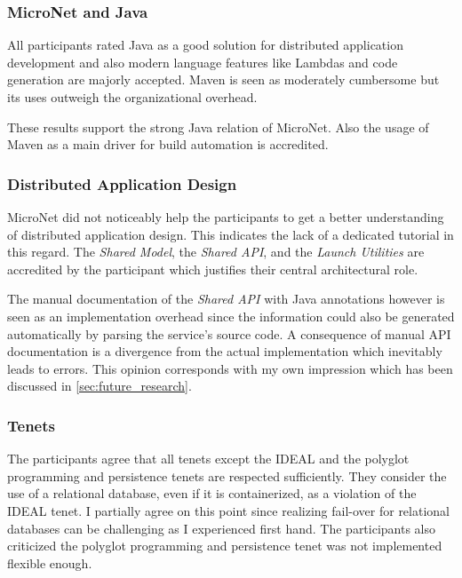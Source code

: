 \subsubsection{MicroNet and Java}

All participants rated Java as a good solution for distributed application
development and also modern language features like Lambdas and code generation
are majorly accepted. Maven is seen as moderately cumbersome but its uses
outweigh the organizational overhead.

These results support the strong Java relation of MicroNet. Also the usage of
Maven as a main driver for build automation is accredited.

\subsubsection{Distributed Application Design}

MicroNet did not noticeably help the participants to get a better understanding
of distributed application design. This indicates the lack of a dedicated
tutorial in this regard. The \textit{Shared Model}, the \textit{Shared API}, and
the \textit{Launch Utilities} are accredited by the participant which justifies
their central architectural role.

The manual documentation of the \textit{Shared API} with Java annotations
however is seen as an implementation overhead since the information could also
be generated automatically by parsing the service's source code. A consequence
of manual API documentation is a divergence from the actual implementation which
inevitably leads to errors. This opinion corresponds with my own impression
which has been discussed in \autoref{sec:future_research}.

\subsubsection{\msuc{} Tenets}

The participants agree that all tenets except the IDEAL and the polyglot
programming and persistence tenets are respected sufficiently. They consider the
use of a relational database, even if it is containerized, as a violation of the
IDEAL tenet. I partially agree on this point since realizing fail-over for
relational databases can be challenging as I experienced first hand. The
participants also criticized the polyglot programming and persistence tenet was
not implemented flexible enough.

